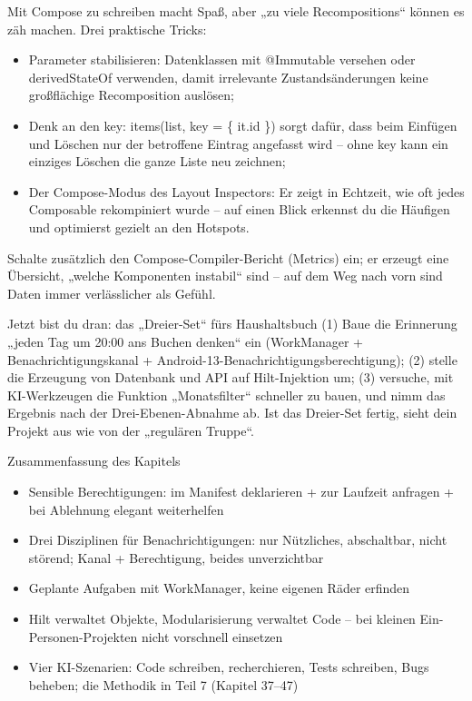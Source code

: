 
Mit Compose zu schreiben macht Spaß, aber „zu viele Recompositions“ können es zäh machen. Drei praktische Tricks:

\begin{itemize}
  \item Parameter stabilisieren: Datenklassen mit @Immutable versehen oder derivedStateOf verwenden, damit irrelevante Zustandsänderungen keine großflächige Recomposition auslösen;
  \item Denk an den key: items(list, key = \{ it.id \}) sorgt dafür, dass beim Einfügen und Löschen nur der betroffene Eintrag angefasst wird – ohne key kann ein einziges Löschen die ganze Liste neu zeichnen;
  \item Der Compose-Modus des Layout Inspectors: Er zeigt in Echtzeit, wie oft jedes Composable rekompiniert wurde – auf einen Blick erkennst du die Häufigen und optimierst gezielt an den Hotspots.
\end{itemize}

Schalte zusätzlich den Compose-Compiler-Bericht (Metrics) ein; er erzeugt eine Übersicht, „welche Komponenten instabil“ sind – auf dem Weg nach vorn sind Daten immer verlässlicher als Gefühl.

\begin{tcbpractice}{Jetzt bist du dran: das „Dreier-Set“ fürs Haushaltsbuch}
(1) Baue die Erinnerung „jeden Tag um 20:00 ans Buchen denken“ ein (WorkManager + Benachrichtigungskanal + Android-13-Benachrichtigungsberechtigung); (2) stelle die Erzeugung von Datenbank und API auf Hilt-Injektion um; (3) versuche, mit KI-Werkzeugen die Funktion „Monatsfilter“ schneller zu bauen, und nimm das Ergebnis nach der Drei-Ebenen-Abnahme ab. Ist das Dreier-Set fertig, sieht dein Projekt aus wie von der „regulären Truppe“.

\end{tcbpractice}

\begin{tcbsummary}{Zusammenfassung des Kapitels}
\begin{itemize}
  \item Sensible Berechtigungen: im Manifest deklarieren + zur Laufzeit anfragen + bei Ablehnung elegant weiterhelfen
  \item Drei Disziplinen für Benachrichtigungen: nur Nützliches, abschaltbar, nicht störend; Kanal + Berechtigung, beides unverzichtbar
  \item Geplante Aufgaben mit WorkManager, keine eigenen Räder erfinden
  \item Hilt verwaltet Objekte, Modularisierung verwaltet Code – bei kleinen Ein-Personen-Projekten nicht vorschnell einsetzen
  \item Vier KI-Szenarien: Code schreiben, recherchieren, Tests schreiben, Bugs beheben; die Methodik in Teil 7 (Kapitel 37–47)
\end{itemize}

\end{tcbsummary}
